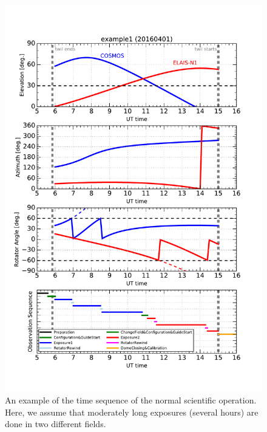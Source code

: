 \documentclass[a4paper]{article}
\begin{document}
\begin{figure}[!htb]
\begin{center}
\includegraphics[scale=0.8]{./figures/example_operation_over_night.pdf}
\end{center}
\caption{An example of the time sequence of the normal scientific operation. Here, we assume that moderately long exposures (several hours) are done in two different fields. \label{fig:operation_sequence_overall2}}
\end{figure}
\end{document}
